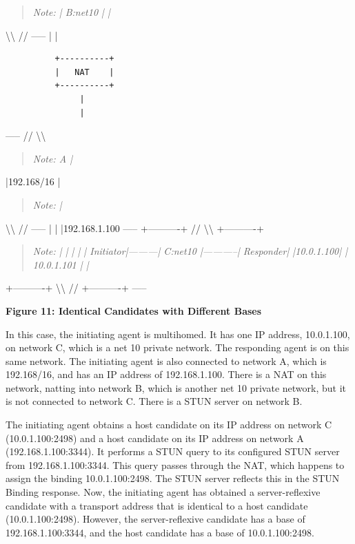 \documentclass{article}
\begin{document}
\begin{quote}
\textit{Note: | B:net10  | |}
\end{quote}

\textbackslash{}\textbackslash{}     // ----- | |

\begin{verbatim}
          +----------+
          |   NAT    |
          +----------+
               |
               |
\end{verbatim}

----- //     \textbackslash{}\textbackslash{}

\begin{quote}
\textit{Note: A    |}
\end{quote}

|192.168/16 |

\begin{quote}
\textit{Note: |}
\end{quote}

\textbackslash{}\textbackslash{}     // ----- | | |192.168.1.100      ----- +----------+           //     \textbackslash{}\textbackslash{}             +----------+

\begin{quote}
\textit{Note: |          |         |            |          | Initiator|---------|  C:net10  |-----------| Responder| |10.0.1.100|         | 10.0.1.101 |          |}
\end{quote}

+----------+           \textbackslash{}\textbackslash{}     //             +----------+ -----

\begin{center}
\textbf{Figure 11: Identical Candidates with Different Bases}
\end{center}

In this case, the initiating agent is multihomed.  It has one IP address, 10.0.1.100, on network C, which is a net 10 private network. The responding agent is on this same network.  The initiating agent is also connected to network A, which is 192.168/16, and has an IP address of 192.168.1.100.  There is a NAT on this network, natting into network B, which is another net 10 private network, but it is not connected to network C.  There is a STUN server on network B.

The initiating agent obtains a host candidate on its IP address on network C (10.0.1.100:2498) and a host candidate on its IP address on network A (192.168.1.100:3344).  It performs a STUN query to its configured STUN server from 192.168.1.100:3344.  This query passes through the NAT, which happens to assign the binding 10.0.1.100:2498. The STUN server reflects this in the STUN Binding response.  Now, the initiating agent has obtained a server-reflexive candidate with a transport address that is identical to a host candidate (10.0.1.100:2498).  However, the server-reflexive candidate has a base of 192.168.1.100:3344, and the host candidate has a base of 10.0.1.100:2498.
\end{document}
